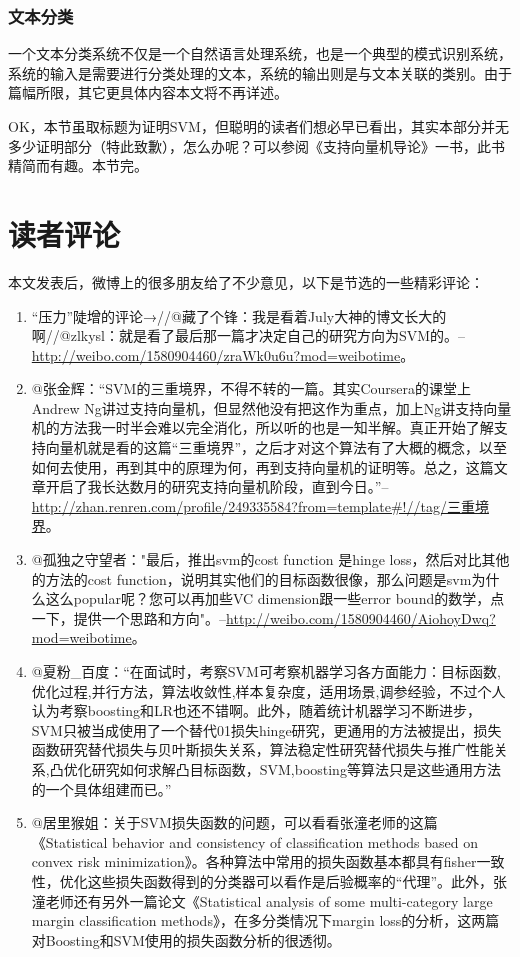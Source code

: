 \documentclass[a4paper,12pt]{article}
\begin{document}
\subsubsection{文本分类}
一个文本分类系统不仅是一个自然语言处理系统，也是一个典型的模式识别系统，系统的输入是需要进行分类处理的文本，系统的输出则是与文本关联的类别。由于篇幅所限，其它更具体内容本文将不再详述。

OK，本节虽取标题为证明SVM，但聪明的读者们想必早已看出，其实本部分并无多少证明部分（特此致歉），怎么办呢？可以参阅《支持向量机导论》一书，此书精简而有趣。本节完。

\section*{读者评论}
本文发表后，微博上的很多朋友给了不少意见，以下是节选的一些精彩评论：
\begin{enumerate}[1.~]
\item “压力”陡增的评论→//@藏了个锋：我是看着July大神的博文长大的啊//@zlkysl：就是看了最后那一篇才决定自己的研究方向为SVM的。--\url{http://weibo.com/1580904460/zraWk0u6u?mod=weibotime}。
    \item @张金辉：“SVM的三重境界，不得不转的一篇。其实Coursera的课堂上Andrew Ng讲过支持向量机，但显然他没有把这作为重点，加上Ng讲支持向量机的方法我一时半会难以完全消化，所以听的也是一知半解。真正开始了解支持向量机就是看的这篇“三重境界”，之后才对这个算法有了大概的概念，以至如何去使用，再到其中的原理为何，再到支持向量机的证明等。总之，这篇文章开启了我长达数月的研究支持向量机阶段，直到今日。”--\url{http://zhan.renren.com/profile/249335584?from=template#!//tag/三重境界}。
    \item @孤独之守望者："最后，推出svm的cost function 是hinge loss，然后对比其他的方法的cost function，说明其实他们的目标函数很像，那么问题是svm为什么这么popular呢？您可以再加些VC dimension跟一些error bound的数学，点一下，提供一个思路和方向"。--\url{http://weibo.com/1580904460/AiohoyDwq?mod=weibotime}。
    \item @夏粉\_百度：“在面试时，考察SVM可考察机器学习各方面能力：目标函数,优化过程,并行方法，算法收敛性,样本复杂度，适用场景,调参经验，不过个人认为考察boosting和LR也还不错啊。此外，随着统计机器学习不断进步，SVM只被当成使用了一个替代01损失hinge研究，更通用的方法被提出，损失函数研究替代损失与贝叶斯损失关系，算法稳定性研究替代损失与推广性能关系,凸优化研究如何求解凸目标函数，SVM,boosting等算法只是这些通用方法的一个具体组建而已。”
    \item @居里猴姐：关于SVM损失函数的问题，可以看看张潼老师的这篇《Statistical behavior and consistency of classification methods based on convex risk minimization》。各种算法中常用的损失函数基本都具有fisher一致性，优化这些损失函数得到的分类器可以看作是后验概率的“代理”。此外，张潼老师还有另外一篇论文《Statistical analysis of some multi-category large margin classification methods》，在多分类情况下margin loss的分析，这两篇对Boosting和SVM使用的损失函数分析的很透彻。

\end{enumerate}
\end{document}
